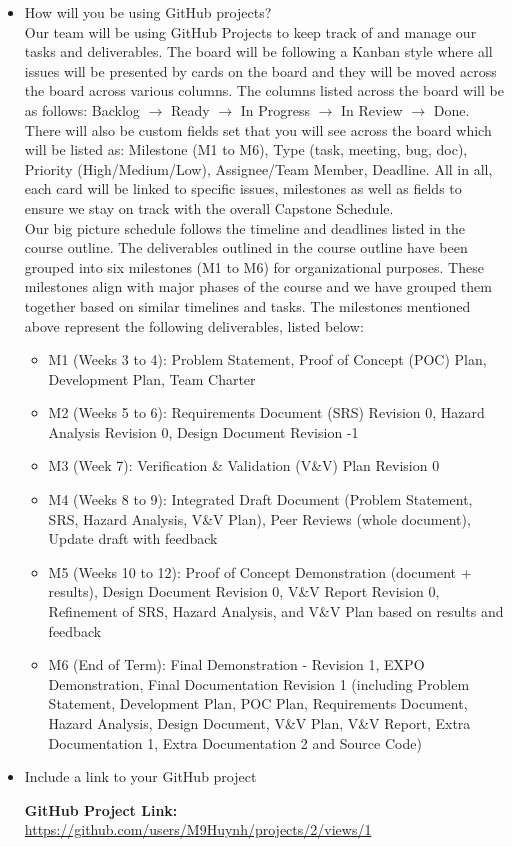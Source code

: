 \documentclass{article}
\begin{document}
\begin{itemize}
 \item How will you be using GitHub projects? \\
 
Our team will be using GitHub Projects to keep track of and manage our tasks and deliverables. The board will be following a
Kanban style where all issues will be presented by cards on the board and they will be moved across the board across various
columns. The columns listed across the board will be as follows: Backlog $\rightarrow$ Ready $\rightarrow$ In Progress $\rightarrow$
In Review $\rightarrow$ Done. There will
also be custom fields set that you will see across the board which will be listed as: Milestone (M1 to M6), Type (task, meeting,
bug, doc), Priority (High/Medium/Low), Assignee/Team Member, Deadline. All in all, each card will be linked to specific issues,
milestones as well as fields to ensure we stay on track with the overall Capstone Schedule. \\


Our big picture schedule follows the timeline and deadlines listed in the course outline. The deliverables outlined in the course
outline have been grouped into six milestones (M1 to M6) for organizational purposes. These milestones align with major phases of the
course and we have grouped them together based on similar timelines and tasks. The milestones mentioned above represent the
following deliverables, listed below:


 \begin{itemize}
   \item M1 (Weeks 3 to 4): Problem Statement, Proof of Concept (POC) Plan, Development Plan, Team Charter
   \item M2 (Weeks 5 to 6): Requirements Document (SRS) Revision 0, Hazard Analysis Revision 0, Design Document Revision -1
   \item M3 (Week 7): Verification \& Validation (V\&V) Plan Revision 0
   \item M4 (Weeks 8 to 9): Integrated Draft Document (Problem Statement, SRS, Hazard Analysis, V\&V Plan), Peer Reviews (whole document), Update draft with feedback
   \item M5 (Weeks 10 to 12): Proof of Concept Demonstration (document + results), Design Document Revision 0, V\&V Report Revision 0, Refinement of SRS, Hazard Analysis, and V\&V Plan based on results and feedback
   \item M6 (End of Term): Final Demonstration - Revision 1, EXPO Demonstration, Final Documentation Revision 1 (including Problem Statement, Development Plan, POC Plan, Requirements Document, Hazard Analysis, Design Document, V\&V Plan, V\&V Report, Extra Documentation 1, Extra Documentation 2 and Source Code)
 \end{itemize}




 \item Include a link to your GitHub project


 \textbf{GitHub Project Link:} \url{https://github.com/users/M9Huynh/projects/2/views/1}


\end{itemize}
\end{document}
